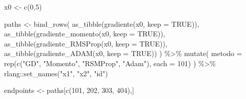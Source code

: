 \documentclass[
  a4paperpaper,
]{article}
\newenvironment{Shaded}{\begin{snugshade}}{\end{snugshade}}
\newcommand{\AttributeTok}[1]{\textcolor[rgb]{0.40,0.45,0.13}{#1}}
\newcommand{\ConstantTok}[1]{\textcolor[rgb]{0.56,0.35,0.01}{#1}}
\newcommand{\DecValTok}[1]{\textcolor[rgb]{0.68,0.00,0.00}{#1}}
\newcommand{\FunctionTok}[1]{\textcolor[rgb]{0.28,0.35,0.67}{#1}}
\newcommand{\NormalTok}[1]{\textcolor[rgb]{0.00,0.23,0.31}{#1}}
\newcommand{\OtherTok}[1]{\textcolor[rgb]{0.00,0.23,0.31}{#1}}
\newcommand{\SpecialCharTok}[1]{\textcolor[rgb]{0.37,0.37,0.37}{#1}}
\newcommand{\StringTok}[1]{\textcolor[rgb]{0.13,0.47,0.30}{#1}}
\begin{document}
\begin{Shaded}
\begin{Highlighting}[]
\NormalTok{x0 }\OtherTok{\textless{}{-}} \FunctionTok{c}\NormalTok{(}\DecValTok{0}\NormalTok{,}\DecValTok{5}\NormalTok{)}

\NormalTok{paths }\OtherTok{\textless{}{-}} \FunctionTok{bind\_rows}\NormalTok{(}
  \FunctionTok{as\_tibble}\NormalTok{(}\FunctionTok{gradiente}\NormalTok{(x0, }\AttributeTok{keep =} \ConstantTok{TRUE}\NormalTok{)),}
  \FunctionTok{as\_tibble}\NormalTok{(}\FunctionTok{gradiente\_momento}\NormalTok{(x0, }\AttributeTok{keep =} \ConstantTok{TRUE}\NormalTok{)),}
  \FunctionTok{as\_tibble}\NormalTok{(}\FunctionTok{gradiente\_RMSProp}\NormalTok{(x0, }\AttributeTok{keep =} \ConstantTok{TRUE}\NormalTok{)),}
  \FunctionTok{as\_tibble}\NormalTok{(}\FunctionTok{gradiente\_ADAM}\NormalTok{(x0, }\AttributeTok{keep =} \ConstantTok{TRUE}\NormalTok{))}
\NormalTok{) }\SpecialCharTok{\%\textgreater{}\%}
  \FunctionTok{mutate}\NormalTok{(}
    \AttributeTok{metodo =} \FunctionTok{rep}\NormalTok{(}\FunctionTok{c}\NormalTok{(}\StringTok{"GD"}\NormalTok{, }\StringTok{"Momento"}\NormalTok{, }\StringTok{"RSMProp"}\NormalTok{, }\StringTok{"Adam"}\NormalTok{), }\AttributeTok{each =} \DecValTok{101}\NormalTok{)}
\NormalTok{  ) }\SpecialCharTok{\%\textgreater{}\%}
\NormalTok{  rlang}\SpecialCharTok{::}\FunctionTok{set\_names}\NormalTok{(}\StringTok{"x1"}\NormalTok{, }\StringTok{"x2"}\NormalTok{, }\StringTok{"id"}\NormalTok{)}

\NormalTok{endpoints }\OtherTok{\textless{}{-}}\NormalTok{ paths[}\FunctionTok{c}\NormalTok{(}\DecValTok{101}\NormalTok{, }\DecValTok{202}\NormalTok{, }\DecValTok{303}\NormalTok{, }\DecValTok{404}\NormalTok{),]}


\end{Highlighting}
\end{Shaded}
\end{document}
